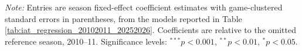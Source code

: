 \begin{table}[htbp]
\vspace{0.4em}
\parbox{0.85\textwidth}{
\footnotesize
\textit{Note:} Entries are season fixed-effect coefficient estimates with game-clustered standard errors in parentheses, from the models reported in Table \ref{tab:iat_regression_20102011_20252026}. Coefficients are relative to the omitted reference season, 2010--11. Significance levels: $^{***}p<0.001$, $^{**}p<0.01$, $^{*}p<0.05$.
}
\end{table}
